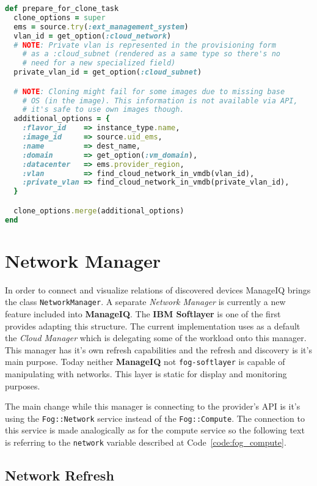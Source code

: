 \begin{lstlisting}[language=Ruby,caption={Prepare cloning options},label=code:cloning,float=htpb]
def prepare_for_clone_task
  clone_options = super
  ems = source.try(:ext_management_system)
  vlan_id = get_option(:cloud_network)
  # NOTE: Private vlan is represented in the provisioning form
	# as a :cloud_subnet (rendered as a same type so there's no
	# need for a new specialized field)
  private_vlan_id = get_option(:cloud_subnet)

  # NOTE: Cloning might fail for some images due to missing base
	# OS (in the image). This information is not available via API,
	# it's safe to use own images though.
  additional_options = {
    :flavor_id    => instance_type.name,
    :image_id     => source.uid_ems,
    :name         => dest_name,
    :domain       => get_option(:vm_domain),
    :datacenter   => ems.provider_region,
    :vlan         => find_cloud_network_in_vmdb(vlan_id),
    :private_vlan => find_cloud_network_in_vmdb(private_vlan_id),
  }

  clone_options.merge(additional_options)
end
\end{lstlisting}

\clearpage
\section{Network Manager}
\label{sec:Network Manager}

In order to connect and visualize relations of discovered devices ManageIQ brings the class \texttt{NetworkManager}. A separate \emph{Network Manager} is currently a new feature included into \textbf{ManageIQ}. The \textbf{IBM Softlayer} is one of the first provides adapting this structure. The current implementation uses as a default the \emph{Cloud Manager} which is delegating some of the workload onto this manager. This manager has it's own refresh capabilities and the refresh and discovery is it's main purpose. Today neither \textbf{ManageIQ} not \texttt{fog-softlayer} is capable of manipulating with networks. This layer is static for display and monitoring purposes.

The main change while this manager is connecting to the provider's API is it's using the \texttt{Fog::Network} service instead of the \texttt{Fog::Compute}. The connection to this service is made analogically as for the compute service so the following text is referring to the \texttt{network} variable described at Code~\ref{code:fog_compute}.

\subsection{Network Refresh}
\label{sub:Network Refresh}


